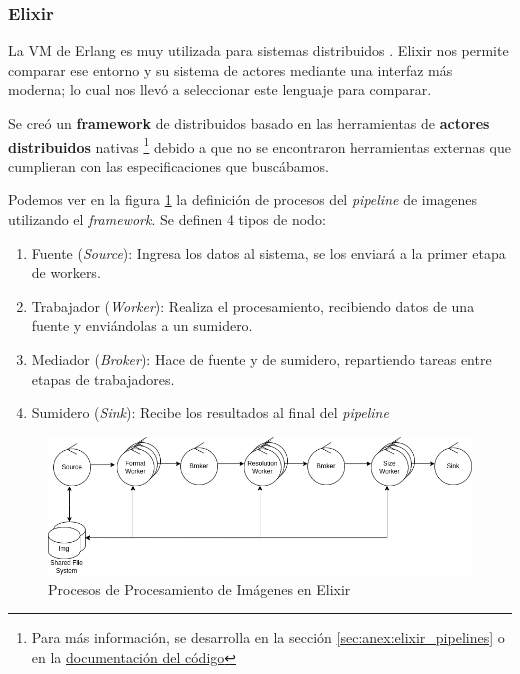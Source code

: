 \documentclass[11pt]{article}
\let\Oldsubsubsection\subsubsection
\renewcommand{\subsubsection}{\FloatBarrier\Oldsubsubsection}
\begin{document}
\subsubsection{Elixir}

La VM de Erlang es muy utilizada para sistemas distribuidos \cite{elx:ex:companies} \cite{scala:lib:rabbit}. Elixir nos permite comparar ese entorno y su sistema de actores mediante una interfaz más moderna; lo cual nos llevó a seleccionar este lenguaje para comparar.

Se creó un \textbf{framework} de distribuidos basado en las herramientas de \textbf{actores distribuidos} nativas \footnote{Para más información, se desarrolla en la sección \ref{sec:anex:elixir_pipelines} o en la \href{https://github.com/tpf-concurrent-benchmarks/image_processing_elixir/blob/main/distributed_pipeline/lib/nodes/README.md}{documentación del código}} debido a que no se encontraron herramientas externas que cumplieran con las especificaciones que buscábamos.

Podemos ver en la figura \ref{fig:elx:image_processing_framework} la definición de procesos del \textit{pipeline} de imagenes utilizando el \textit{framework}. Se definen 4 tipos de nodo:
\begin{enumerate}
\item Fuente (\textit{Source}): Ingresa los datos al sistema, se los enviará a la primer etapa de workers.
    \item Trabajador (\textit{Worker}): Realiza el procesamiento, recibiendo datos de una fuente y enviándolas a un sumidero.
    \item   Mediador (\textit{Broker}): Hace de fuente y de sumidero, repartiendo tareas entre etapas de trabajadores.
    \item  Sumidero (\textit{Sink}): Recibe los resultados al final del \textit{pipeline}
\end{enumerate}

\begin{figure}[ht]
    \centering
    \includegraphics[scale=0.4]{resources/distributed_systems/elixir/image_processing_framework.png}
    \caption{Procesos de Procesamiento de Imágenes en Elixir}
    \label{fig:elx:image_processing_framework}
\end{figure}
\end{document}

